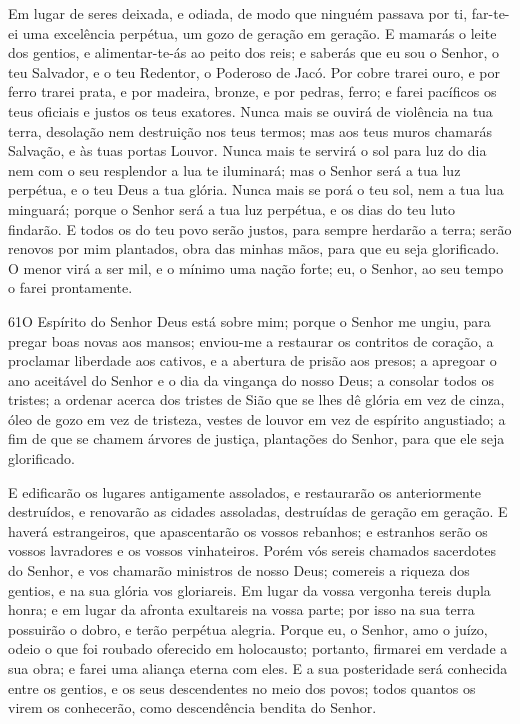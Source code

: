 Em lugar de seres deixada, e odiada, de modo que ninguém passava
por ti, far-te-ei uma excelência perpétua, um gozo de geração em
geração. E mamarás o leite dos gentios, e alimentar-te-ás ao
peito dos reis; e saberás que eu sou o Senhor, o teu Salvador, e o
teu Redentor, o Poderoso de Jacó. Por cobre trarei ouro, e
por ferro trarei prata, e por madeira, bronze, e por pedras, ferro;
e farei pacíficos os teus oficiais e justos os teus exatores.
Nunca mais se ouvirá de violência na tua terra, desolação nem
destruição nos teus termos; mas aos teus muros chamarás Salvação, e
às tuas portas Louvor. Nunca mais te servirá o sol para luz
do dia nem com o seu resplendor a lua te iluminará; mas o Senhor
será a tua luz perpétua, e o teu Deus a tua glória. Nunca
mais se porá o teu sol, nem a tua lua minguará; porque o Senhor será
a tua luz perpétua, e os dias do teu luto findarão. E todos
os do teu povo serão justos, para sempre herdarão a terra; serão
renovos por mim plantados, obra das minhas mãos, para que eu seja
glorificado. O menor virá a ser mil, e o mínimo uma nação
forte; eu, o Senhor, ao seu tempo o farei prontamente.

\medskip

\lettrine{61}{}O Espírito do Senhor Deus está sobre mim; porque
o Senhor me ungiu, para pregar boas novas aos mansos; enviou-me a
restaurar os contritos de coração, a proclamar liberdade aos
cativos, e a abertura de prisão aos presos; a apregoar o ano
aceitável do Senhor e o dia da vingança do nosso Deus; a consolar
todos os tristes; a ordenar acerca dos tristes de Sião que se
lhes dê glória em vez de cinza, óleo de gozo em vez de tristeza,
vestes de louvor em vez de espírito angustiado; a fim de que se
chamem árvores de justiça, plantações do Senhor, para que ele seja
glorificado.

E edificarão os lugares antigamente assolados, e restaurarão os
anteriormente destruídos, e renovarão as cidades assoladas,
destruídas de geração em geração. E haverá estrangeiros, que
apascentarão os vossos rebanhos; e estranhos serão os vossos
lavradores e os vossos vinhateiros. Porém vós sereis chamados
sacerdotes do Senhor, e vos chamarão ministros de nosso Deus;
comereis a riqueza dos gentios, e na sua glória vos gloriareis.
Em lugar da vossa vergonha tereis dupla honra; e em lugar da
afronta exultareis na vossa parte; por isso na sua terra possuirão o
dobro, e terão perpétua alegria. Porque eu, o Senhor, amo o
juízo, odeio o que foi roubado oferecido em holocausto; portanto,
firmarei em verdade a sua obra; e farei uma aliança eterna com eles.
E a sua posteridade será conhecida entre os gentios, e os seus
descendentes no meio dos povos; todos quantos os virem os
conhecerão, como descendência bendita do Senhor.

